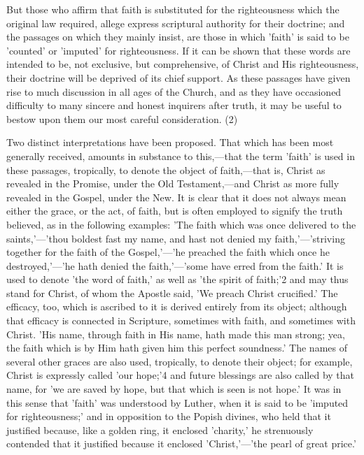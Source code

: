 \documentclass[
]{book}
\begin{document}
But those who affirm that faith is substituted for the righteousness which the original law required, allege express scriptural authority for their doctrine; and the passages on which they mainly insist, are those in which 'faith' is said to be 'counted' or 'imputed' for righteousness. If it can be shown that these words are intended to be, not exclusive, but comprehensive, of Christ and His righteousness, their doctrine will be deprived of its chief support. As these passages have given rise to much discussion in all ages of the Church, and as they have occasioned difficulty to many sincere and honest inquirers after truth, it may be useful to bestow upon them our most careful consideration. (2)

Two distinct interpretations have been proposed. That which has been most generally received, amounts in substance to this,---that the term 'faith' is used in these passages, tropically, to denote the object of faith,---that is, Christ as revealed in the Promise, under the Old Testament,---and Christ as more fully revealed in the Gospel, under the New. It is clear that it does not always mean either the grace, or the act, of faith, but is often employed to signify the truth believed, as in the following examples: 'The faith which was once delivered to the saints,'---'thou boldest fast my name, and hast not denied my faith,'---'striving together for the faith of the Gospel,'---'he preached the faith which once he destroyed,'---'he hath denied the faith,'---'some have erred from the faith.' It is used to denote 'the word of faith,' as well as 'the spirit of faith;'2 and may thus stand for Christ, of whom the Apostle said, 'We preach Christ crucified.' The efficacy, too, which is ascribed to it is derived entirely from its object; although that efficacy is connected in Scripture, sometimes with faith, and sometimes with Christ. 'His name, through faith in His name, hath made this man strong; yea, the faith which is by Him hath given him this perfect soundness.' The names of several other graces are also used, tropically, to denote their object; for example, Christ is expressly called 'our hope;'4 and future blessings are also called by that name, for 'we are saved by hope, but that which is seen is not hope.' It was in this sense that 'faith' was understood by Luther, when it is said to be 'imputed for righteousness;' and in opposition to the Popish divines, who held that it justified because, like a golden ring, it enclosed 'charity,' he strenuously contended that it justified because it enclosed 'Christ,'---'the pearl of great price.'
\end{document}
